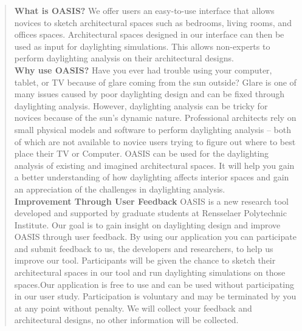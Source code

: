 \documentclass[12pt]{article}
\begin{document}
\begin{quote}

\textbf{What is OASIS?}
We offer users an easy-to-use interface that allows novices to sketch architectural spaces such as bedrooms, living rooms, and offices spaces. Architectural spaces designed in our interface can then be used as input for daylighting simulations. This allows non-experts to perform daylighting analysis on their architectural designs.\\ 

\textbf{Why use OASIS?}
Have you ever had trouble using your computer, tablet, or TV because of glare coming from the sun outside? Glare is one of many issues caused by poor daylighting design and can be fixed through daylighting analysis. However, daylighting analysis can be tricky for novices because of the sun's dynamic nature. Professional architects rely on small physical models and software to perform daylighting analysis -- both of which are not available to novice users trying to figure out where to best place their TV or Computer. OASIS can be used for the daylighting analysis of existing and imagined architectural spaces. It will help you gain a better understanding of how daylighting affects interior spaces and gain an appreciation of the challenges in daylighting analysis.\\

\textbf{Improvement Through User Feedback}
OASIS is a new research tool developed and supported by graduate students at Rensselaer Polytechnic Institute. Our goal is to gain insight on daylighting design and improve OASIS through user feedback. By using our application you can participate and submit feedback to us, the developers and researchers, to help us improve our tool. Participants will be given the chance to sketch their architectural spaces in our tool and run daylighting simulations on those spaces.Our application is free to use and can be used without participating in our user study. Participation is voluntary and may be terminated by you at any point without penalty. We will collect your feedback and architectural designs, no other information will be collected. \\

\end{quote}
\end{document}
